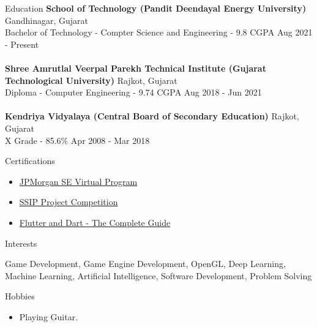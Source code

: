 \documentclass{resume} %
\begin{document}
\begin{rSection}{Education}
{\bf School of Technology (Pandit Deendayal Energy University)} \hfill {Gandhinagar, Gujarat}\\
Bachelor of Technology - Compter Science and Engineering - 9.8 CGPA \hfill {Aug 2021 - Present}\\
\\
{\bf Shree Amrutlal Veerpal Parekh Technical Institute (Gujarat Technological University)} \hfill {Rajkot, Gujarat}\\
Diploma - Computer Engineering - 9.74 CGPA \hfill {Aug 2018 - Jun 2021}\\
\\
{\bf Kendriya Vidyalaya (Central Board of Secondary Education)} \hfill {Rajkot, Gujarat}\\
X Grade - 85.6\% \hfill {Apr 2008 - Mar 2018}
\end{rSection}

\begin{rSection}{Certifications} 
\begin{itemize}
    \item   \href{https://jaynakum.github.io/assets/Achievements/JPMC.jpg}{JPMorgan SE Virtual Program}
    \item   \href{https://jaynakum.github.io/assets/Achievements/SSIP.jpg}{SSIP Project Competition}
    \item   \href{https://www.udemy.com/certificate/UC-2fce7723-1cc7-403d-a54b-09dbd5cd495e/}{Flutter and Dart - The Complete Guide}
\end{itemize}
\end{rSection}

\begin{rSection}{Interests} 
\begin{itemize}
    Game Development, Game Engine Development, OpenGL, Deep Learning, Machine Learning, Artificial Intelligence, Software Development, Problem Solving
\end{itemize}
\end{rSection}

\begin{rSection}{Hobbies} 
\begin{itemize}
    \item 	Playing Guitar.
\end{itemize}
\end{rSection}
\end{document}
